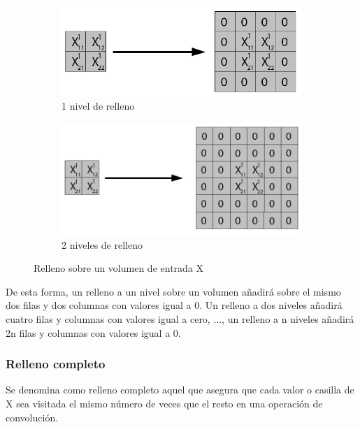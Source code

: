 \begin{figure}[H]
	\centering
	\begin{subfigure}{.5\textwidth}
		\hspace{-15mm}
		\includegraphics[width=1.2\linewidth]{imagenes/padding_a_1_nivel.jpg}  
		\caption{1 nivel de relleno}
	\end{subfigure}%
	\begin{subfigure}{.5\textwidth}
		\hspace{5mm}
		\includegraphics[width=1.2\linewidth]{imagenes/padding_a_2_niveles.jpg}  
		\caption{2 niveles de relleno}
	\end{subfigure}
	\caption{Relleno sobre un volumen de entrada X}
	\label{fig:padding}
\end{figure}

De esta forma, un relleno a un nivel sobre un volumen añadirá sobre el mismo dos filas y dos columnas con valores igual a 0. Un relleno a dos niveles añadirá cuatro filas y columnas con valores igual a cero, ..., un relleno a n niveles añadirá 2n filas y columnas con valores igual a 0.

\subsubsection{Relleno completo}

Se denomina como relleno completo \cite{full_padding_definicion} \cite{padding_2} aquel que asegura que cada valor o casilla de X sea visitada el mismo número de veces que el resto en una operación de convolución.

